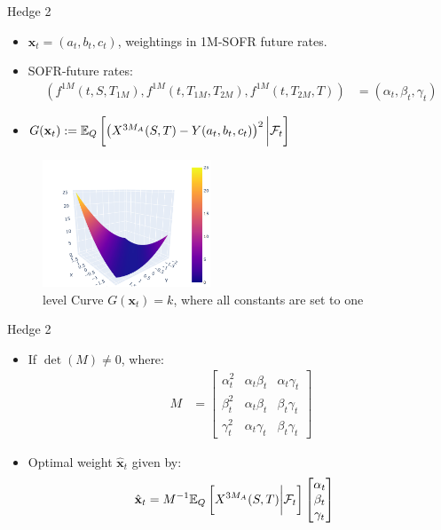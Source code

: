 \documentclass[UKenglish]{beamer}
\newcommand{\E}{\mathbb{E}}  %
\newcommand{\F}{\mathcal{F}} %
\begin{document}
\begin{frame}{Hedge 2}
\begin{itemize}
    \item $\mathbf{x}_{t} = (a_{t}, b_{t}, c_{t})$, weightings in 1M-SOFR future rates.  
    \item SOFR-future rates:
    \begin{align*}
    \left(
    f^{1M}(t,S,T_{1M}), f^{1M}(t,T_{1M}, T_{2M}), f^{1M}(t,T_{2M}, T)
    \right)
    &= (\alpha_{t}, \beta_{t}, \gamma_{t})
    \end{align*}
    \item $G(\mathbf{x}_{t}) := \E_{Q}\left[
          \left(
          X^{3M_{A}}(S,T)-Y(a_{t}, b_{t}, c_{t})
          \right)^{2}
          \bigg{|}\F_{t}
          \right] $
\end{itemize}

\begin{figure}[htp]
    \centering
    \includegraphics[width=5cm]{SOFR/plot_G(x)_special_case.PNG}
    \caption{level Curve $G(\mathbf{x}_{t}) = k$, where all constants are set to one}
    \label{fig: plot_G(x)_SOFR_1M}
\end{figure}


\end{frame}


\begin{frame}{Hedge 2}
\begin{itemize}
    \item If $\det(M)\neq 0$, where:
    \begin{align*}
    M &= 
    \begin{bmatrix}
    \alpha_{t}^{2} & \alpha_{t}\beta_{t} &  \alpha_{t}\gamma_{t} \\ 
    \beta_{t}^{2} & \alpha_{t}\beta_{t} &   \beta_{t}\gamma_{t} \\ 
    \gamma_{t}^{2} & \alpha_{t}\gamma_{t} &     \beta_{t}\gamma_{t}
    \end{bmatrix}
    \end{align*}
    \item Optimal weight $\hat{\mathbf{x}}_{t}$ given by: 
    \begin{align*}
    \hat{\mathbf{x}}_{t} &= M^{-1}\E_{Q}\left[
    X^{3M_{A}}(S,T)\bigg{|}\F_{t}
    \right]
    \begin{bmatrix}
    \alpha_{t} \\ 
    \beta_{t} \\ 
    \gamma_{t} 
    \end{bmatrix}
    \end{align*}
\end{itemize}  
\end{frame}
\end{document}
